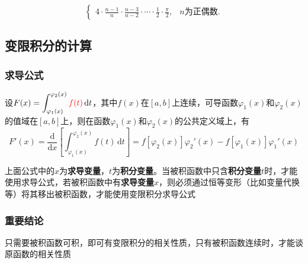 \documentclass[../book.tex]{subfiles}
\begin{document}
\begin{enumerate}
\begin{itemize}
\[\begin{cases}
                    \displaystyle
                    4
                    \cdot
                    \frac{n-1}{n}
                    \cdot
                    \frac{n-3}{n-2}
                    \cdot
                    \cdots
                    \cdot
                    \frac{1}{2}
                    \cdot
                    \frac{\pi}{2},
                    & n \text{为正偶数}.
                \end{cases}
            \]
        \end{itemize}
    \end{enumerate}

    \subsection{变限积分的计算}

    \subsubsection{求导公式}

    设$F(x) = \displaystyle\int_{\varphi_1(x)}^{\varphi_2(x)} {\color{red}{f(t)}}\,\mathrm{d}t$，其中$f(x)$在$[a, b]$上连续，可导函数$\varphi_1(x)$和$\varphi_2(x)$的值域在$[a, b]$上，则在函数$\varphi_1(x)$和$\varphi_2(x)$的公共定义域上，有
    \[
        F'(x) = \frac{\mathrm{d}}{\mathrm{d}x}\left[\int_{\varphi_1(x)}^{\varphi_2(x)} f(t)\,\mathrm{d}t\right] = f[\varphi_2(x)]\varphi_2'(x) - f[\varphi_1(x)]\varphi_1'(x)
    \]

    上面公式中的$x$为\textbf{求导变量}，$t$为\textbf{积分变量}。当被积函数中只含\textbf{积分变量}$t$时，才能使用求导公式，若被积函数中有\textbf{求导变量}$x$，则必须通过恒等变形（比如变量代换等）将其移出被积函数，才能使用变限积分求导公式

    \subsubsection{重要结论}

    只需要被积函数可积，即可有变限积分的相关性质，只有被积函数连续时，才能谈原函数的相关性质
\end{document}
